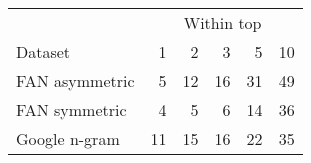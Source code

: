 \begin{tabular}{lrrrrr}\toprule
& \multicolumn{5}{c}{Within top} \\
\cmidrule{2-6}
Dataset & 1 & 2 & 3 & 5 & 10 \\
\midrule
FAN asymmetric & 5 & 12 & 16 & 31 & 49 \\
FAN symmetric & 4 & 5 & 6 & 14 & 36 \\
Google n-gram & 11 & 15 & 16 & 22 & 35 \\
\bottomrule
\end{tabular}
